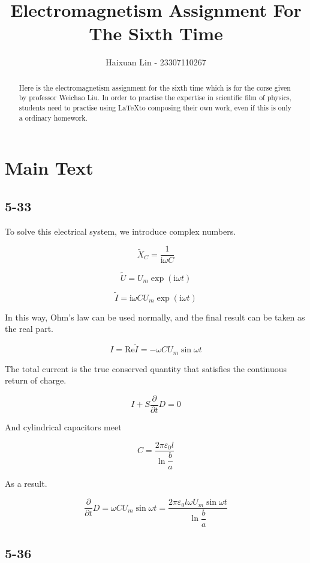 \documentclass[a4paper,11pt]{amsart}
\title{Electromagnetism Assignment For The Sixth Time}
\author{Haixuan Lin - 23307110267}
\theoremstyle{definition}
\begin{document}
	
	\begin{abstract}
		Here is the electromagnetism assignment for the sixth time which is for the corse given by professor Weichao Liu. In order to practise the expertise in scientific film of physics, students need to practise using \LaTeX to composing their own work, even if this is only a ordinary homework.
	\end{abstract}
	
	\maketitle
	
	\section*{Main Text}
	
	\subsection*{5-33}
	
	To solve this electrical system, we introduce complex numbers.
	
	$$
	\tilde{X}_C=\frac{1}{\mathrm{i}\omega C}
	$$
	
	$$
	\tilde{U}=U_m\exp \left( \mathrm{i}\omega t \right) 
	$$
	
	$$
	\tilde{I}=\mathrm{i}\omega CU_m\exp \left( \mathrm{i}\omega t \right) 
	$$
	
	In this way, Ohm's law can be used normally, and the final result can be taken as the real part.
	
	$$
	I=\mathrm{Re}\tilde{I}=-\omega CU_m\sin \omega t
	$$
	
	The total current is the true conserved quantity that satisfies the continuous return of charge.
	
	$$
	I+S\frac{\partial}{\partial t}D=0
	$$
	
	And cylindrical capacitors meet
	
	$$
	C=\dfrac{2\pi \varepsilon _0l}{\ln \dfrac{b}{a}}
	$$
	
	As a result.
	
	$$
	\displaystyle \frac{\partial}{\partial t}D=\omega CU_m\sin \omega t=\frac{2\pi \varepsilon _0l\omega U_m\sin \omega t}{\ln \dfrac{b}{a}}
	$$
	
	\subsection*{5-36}
	
\end{document}
